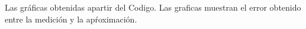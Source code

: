 \documentclass[12pt,a4paper,openright]{article}
\begin{document}
Las gráficas obtenidas apartir del Codigo. Las graficas muestran el error obtenido entre la medición y la apŕoximación.\\

\begin{figure}[htb]
\centering
{} \hspace{10mm}
 \hspace{10mm} 

\end{figure}
\end{document}
